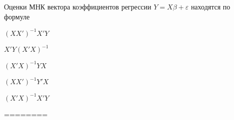 
\begin{question}
Оценки МНК вектора коэффициентов регрессии \(Y=X\beta + \varepsilon\)
находятся по формуле
\begin{answerlist}
  \item \((XX')^{-1}X'Y\)
  \item \(X'Y(X'X)^{-1}\)
  \item \((X'X)^{-1}YX\)
  \item \((XX')^{-1}Y'X\)
  \item \((X'X)^{-1}X'Y\)
\end{answerlist}
\end{question}

\begin{solution}
========
\end{solution}

